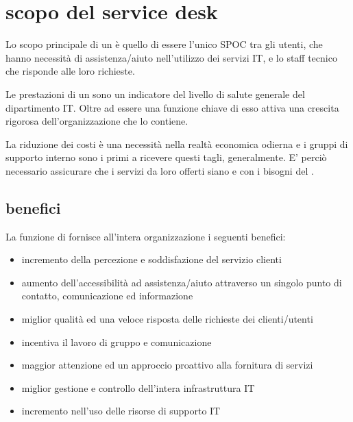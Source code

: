 %
%
\section[Scopo del Service Desk]{scopo del service desk}
\label{sd-scope}
Lo scopo principale di un  è quello di essere l'unico \ac{SPOC} tra gli utenti, che hanno necessità di assistenza/aiuto nell'utilizzo dei servizi \acs{IT}, e lo staff tecnico che risponde alle loro richieste.

Le prestazioni di un  sono un indicatore del livello di salute generale del dipartimento \acs{IT}. Oltre ad essere una funzione chiave di  esso attiva una crescita rigorosa dell'organizzazione che lo contiene.

La riduzione dei costi è una necessità nella realtà economica odierna e i gruppi di supporto interno sono i primi a ricevere questi tagli, generalmente. E' perciò necessario assicurare che i servizi da loro offerti siano  e  con i bisogni del .

\subsection[Benefici]{benefici}
\label{sd-benefits}
La funzione di  fornisce all'intera organizzazione i seguenti benefici:

\begin{itemize}
\item{incremento della percezione e soddisfazione del servizio clienti}
\item{aumento dell'accessibilità ad assistenza/aiuto attraverso un singolo punto di contatto, comunicazione ed informazione}
\item{miglior qualità ed una veloce risposta delle richieste dei clienti/utenti}
\item{incentiva il lavoro di gruppo e comunicazione}
\item{maggior attenzione ed un approccio proattivo alla fornitura di servizi}
\item{miglior gestione e controllo dell'intera infrastruttura \acs{IT}}
\item{incremento nell'uso delle risorse di supporto \acs{IT}}
\end{itemize}


